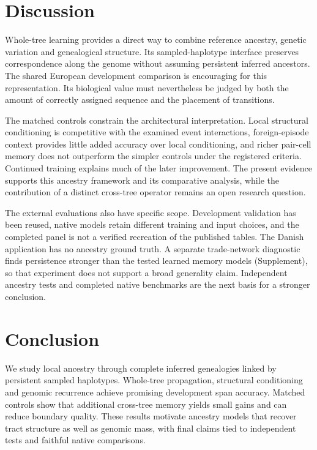 \documentclass[letterpaper]{article}
\begin{document}
\section{Discussion}
Whole-tree learning provides a direct way to combine reference ancestry, genetic variation and genealogical structure. Its sampled-haplotype interface preserves correspondence along the genome without assuming persistent inferred ancestors. The shared European development comparison is encouraging for this representation. Its biological value must nevertheless be judged by both the amount of correctly assigned sequence and the placement of transitions.

The matched controls constrain the architectural interpretation. Local structural conditioning is competitive with the examined event interactions, foreign-episode context provides little added accuracy over local conditioning, and richer pair-cell memory does not outperform the simpler controls under the registered criteria. Continued training explains much of the later improvement. The present evidence supports this ancestry framework and its comparative analysis, while the contribution of a distinct cross-tree operator remains an open research question.

The external evaluations also have specific scope. Development validation has been reused, native models retain different training and input choices, and the completed panel is not a verified recreation of the published tables. The Danish application has no ancestry ground truth. A separate trade-network diagnostic finds persistence stronger than the tested learned memory models (Supplement), so that experiment does not support a broad generality claim. Independent ancestry tests and completed native benchmarks are the next basis for a stronger conclusion.

\section{Conclusion}
We study local ancestry through complete inferred genealogies linked by persistent sampled haplotypes. Whole-tree propagation, structural conditioning and genomic recurrence achieve promising development span accuracy. Matched controls show that additional cross-tree memory yields small gains and can reduce boundary quality. These results motivate ancestry models that recover tract structure as well as genomic mass, with final claims tied to independent tests and faithful native comparisons.
\end{document}
